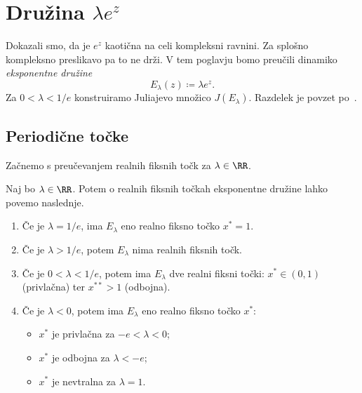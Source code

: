 \section{Družina \texorpdfstring{\(\lambda e^z\)}{\lambda exp(z)}}

Dokazali smo, da je \(e^z\) kaotična na celi kompleksni ravnini. Za splošno kompleksno preslikavo pa to ne drži. V tem poglavju bomo preučili dinamiko \emph{eksponentne družine}
\[E_\lambda (z) \coloneq \lambda e^z.\]
Za \(0 < \lambda < 1/e\) konstruiramo Juliajevo množico \(J (E_\lambda)\). Razdelek je povzet po~\cite[razdelek 9]{Pineiro_2025}.

\subsection{Periodične točke}

Začnemo s preučevanjem realnih fiksnih točk za \(\lambda \in \RR\).

\begin{trditev}
    Naj bo \(\lambda \in \RR\). Potem o realnih fiksnih točkah eksponentne družine lahko povemo naslednje.
    \begin{enumerate}[label=(\arabic*)]
        \item Če je \(\lambda = 1/e\), ima \(E_\lambda\) eno realno fiksno točko \(x^* = 1\).
        \item Če je \(\lambda > 1/e\), potem \(E_\lambda\) nima realnih fiksnih točk.
        \item Če je \(0 < \lambda < 1/e\), potem ima \(E_\lambda\) dve realni fiksni točki: \(x^* \in (0, 1)\) (privlačna) ter \(x^{**} > 1\) (odbojna).
        \item Če je \(\lambda < 0\), potem ima \(E_\lambda\) eno realno fiksno točko \(x^*\):
            \begin{itemize}
                \item \(x^*\) je privlačna za \(-e < \lambda < 0\);
                \item \(x^*\) je odbojna za \(\lambda < -e\);
                \item \(x^*\) je nevtralna za \(\lambda = 1\).
            \end{itemize}
    \end{enumerate}
\end{trditev}

